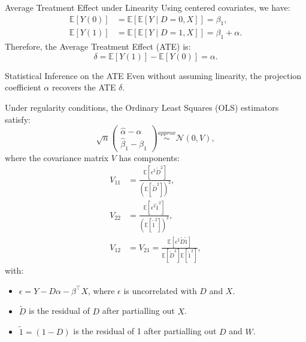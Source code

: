 \documentclass[xcolor=svgnames,t]{beamer}
\begin{document}
    \begin{frame}{Average Treatment Effect under Linearity}
    Using centered covariates, we have:
    \[
    \begin{aligned}
    \mathbb{E}[Y(0)] &= \mathbb{E}\left[ \mathbb{E}[Y \mid D=0, X] \right] = \beta_1, \\
    \mathbb{E}[Y(1)] &= \mathbb{E}\left[ \mathbb{E}[Y \mid D=1, X] \right] = \beta_1 + \alpha.
    \end{aligned}
    \]
    Therefore, the Average Treatment Effect (ATE) is:
    \[
    \delta = \mathbb{E}[Y(1)] - \mathbb{E}[Y(0)] = \alpha.
    \]
    
    \vspace{1cm} %
    
    \end{frame}
    
    \begin{frame}{Statistical Inference on the ATE}
    Even without assuming linearity, the projection coefficient $\alpha$ recovers the ATE $\delta$.
    
    Under regularity conditions, the Ordinary Least Squares (OLS) estimators satisfy:
    \[
    \sqrt{n}
    \begin{pmatrix}
    \hat{\alpha} - \alpha \\
    \hat{\beta}_1 - \beta_1
    \end{pmatrix}
    \overset{approx}{\sim}
    \mathcal{N}\left( 0, V \right),
    \]
    where the covariance matrix $V$ has components:
    \[
    \begin{aligned}
    V_{11} &= \frac{\mathbb{E}[\epsilon^2 \tilde{D}^2]}{\left( \mathbb{E}[\tilde{D}^2] \right)^2}, \\
    V_{22} &= \frac{\mathbb{E}[\epsilon^2 \tilde{1}^2]}{\left( \mathbb{E}[\tilde{1}^2] \right)^2}, \\
    V_{12} &= V_{21} = \frac{\mathbb{E}[\epsilon^2 \tilde{D} \tilde{1}]}{\mathbb{E}[\tilde{D}^2] \mathbb{E}[\tilde{1}^2]},
    \end{aligned}
    \]
    with:
    \begin{itemize}
        \item $\epsilon = Y - D\alpha - \beta^\top X$, where $\epsilon$ is uncorrelated with $D$ and $X$.
        \item $\tilde{D}$ is the residual of $D$ after partialling out $X$.
        \item $\tilde{1} = (1 - D)$ is the residual of 1 after partialling out $D$ and $W$.
    \end{itemize}
    
    \vspace{0.5cm} %
    
    \end{frame}
    
\end{document}
